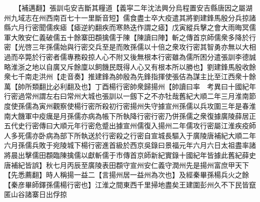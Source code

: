 　　【補邁翻】張訓屯安吉斷其糧道【義寜二年沈法興分烏程置安吉縣唐因之屬湖州九域志在州西南百七十一里斷音短】儒食盡士卒大疫遣其將劉建鋒馬殷分兵掠諸縣六月行密聞儒疾瘧【瘧逆約翻疾而寒熱迭作謂之瘧】戊寅縱兵擊之會大雨晦冥儒軍大敗安仁義破儒五十餘寨田頵擒儒于陳【陳讀曰陣】斬之傳首京師儒衆多降於行密【光啓三年孫儒始與行密交兵至是而敗孫儒以十倍之衆攻行密其智勇亦無以大相過而卒斃於行密者儒專務殺掠人心不附又後無根本行密雖為儒所困分遣張訓李德誠略淮浙之地以自廣又斥餘廩以飼饑民既得人心又有根本所以勝也】劉建鋒馬殷收餘衆七千南走洪州【走音奏】推建鋒為帥殷為先鋒指揮使張佶為謀主比至江西衆十餘萬【帥所類翻比必利翻及也】丁酉楊行密帥衆歸揚州【帥讀曰率　考異曰十國紀年行密過常州謂左右曰常州大城也張訓以一劔下之不亦牡哉舊紀大順二年三月淮南節度使孫儒為寅州觀察使楊行密所殺初行密揚州失守據宣州孫儒以兵攻圍三年是春淮南大饑軍中疫癘是月孫儒亦病為帳下所執降行密行密乃併孫儒之衆復據廣陵薛居正五代史行密傳曰大順元年行密危蹙出據宣州儒復入揚州二年儒攻行密屬江淮疾疫師人多死儒亦卧病為部下所執送於行密殺之行密自宣城長驅入于廣陵唐補紀大順二年六月孫儒兵敗于宛陵城下楊行密進首級於西京吳錄曰景福元年六月六日太祖盡率諸將晨出擊儒田頵臨陳擒儒以獻斬儒于市傳首京師新紀實錄十國紀年皆據此舊紀薛史唐補紀皆誤】秋七月丙辰至廣陵表田頵守宣州安仁義守潤州先是揚州富庶甲天下【先悉薦翻】時人稱揚一益二【言揚州居一益州為次也】及經秦畢孫楊兵火之餘【秦彦畢師鐸孫儒楊行密也】江淮之間東西千里掃地盡矣王建圍彭州久不下民皆竄匿山谷諸寨日出俘掠

